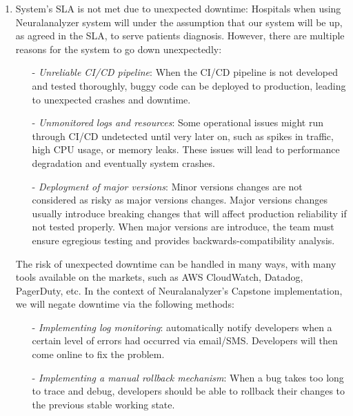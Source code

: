 \documentclass{article}
\begin{document}
\begin{enumerate}
\begin{enumerate}
        
        \item System's SLA is not met due to unexpected downtime: Hospitals when using Neuralanalyzer system will under the assumption that our system will be up, as agreed in the SLA, to serve patients diagnosis. However, there are multiple reasons for the system to go down unexpectedly:
        \begin{itemize}
            \item[-] \emph{Unreliable CI/CD pipeline}: When the CI/CD pipeline is not developed and tested thoroughly, buggy code can be deployed to production, leading to unexpected crashes and downtime.
            \item[-] \emph{Unmonitored logs and resources}: Some operational issues might run through CI/CD undetected until very later on, such as spikes in traffic, high CPU usage, or memory leaks. These issues will lead to performance degradation and eventually system crashes.
            \item[-] \emph{Deployment of major versions}: Minor versions changes are not considered as risky as major versions changes. Major versions changes usually introduce breaking changes that will affect production reliability if not tested properly. When major versions are introduce, the team must ensure egregious testing and provides backwards-compatibility analysis.
        \end{itemize}
        The risk of unexpected downtime can be handled in many ways, with many tools available on the markets, such as AWS CloudWatch, Datadog, PagerDuty, etc. In the context of Neuralanalyzer's Capstone implementation, we will negate downtime via the following methods:
        \begin{itemize}
            \item[-] \emph{Implementing log monitoring}: automatically notify developers when a certain level of errors had occurred via email/SMS. Developers will then come online to fix the problem.
            \item[-] \emph{Implementing a manual rollback mechanism}: When a bug takes too long to trace and debug, developers should be able to rollback their changes to the previous stable working state.
        \end{itemize}
    \end{enumerate}

\end{enumerate}
\end{document}
